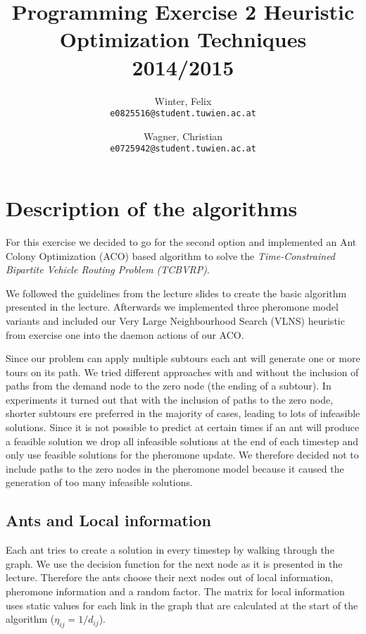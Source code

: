 \documentclass[a4paper]{scrartcl}
\author{
  Winter, Felix\\
  \texttt{e0825516@student.tuwien.ac.at}
  \and
  Wagner, Christian\\
  \texttt{e0725942@student.tuwien.ac.at}
}
\title{Programming Exercise 2 Heuristic Optimization Techniques 2014/2015}
\begin{document}
\setlength{\abovedisplayskip}{0pt}
\setlength{\belowdisplayskip}{0pt}

\begingroup
 \makeatletter
 \maketitle
\endgroup

\section{Description of the algorithms}

For this exercise we decided to go for the second option and implemented an Ant Colony Optimization (ACO) based algorithm to solve the \emph{Time-Constrained Bipartite Vehicle Routing Problem (TCBVRP)}.

We followed the guidelines from the lecture slides to create the basic algorithm presented in the lecture. Afterwards we implemented three pheromone model variants and included our Very Large Neighbourhood Search (VLNS) heuristic from exercise one into the daemon actions of our ACO.

Since our problem can apply multiple subtours each ant will generate one or more tours on its path. We tried different approaches with and without the inclusion of paths from the demand node to the zero node (the ending of a subtour). In experiments it turned out that with the inclusion of paths to the zero node, shorter subtours ere preferred in the majority of cases, leading to lots of infeasible solutions.
Since it is not possible to predict at certain times if an ant will produce a feasible solution we drop all infeasible solutions at the end of each timestep and only use feasible solutions for the pheromone update. We therefore decided not to include paths to the zero nodes in the pheromone model because it caused the generation of too many infeasible solutions.

\subsection{Ants and Local information}
Each ant tries to create a solution in every timestep by walking through the graph.
We use the decision function for the next node as it is presented in the lecture. Therefore the ants choose their next nodes out of local information, pheromone information and a random factor. The matrix for local information uses static values for each link in the graph that are calculated at the start of the algorithm ($\eta_{ij} = 1 / d_{ij}$). 
\end{document}
